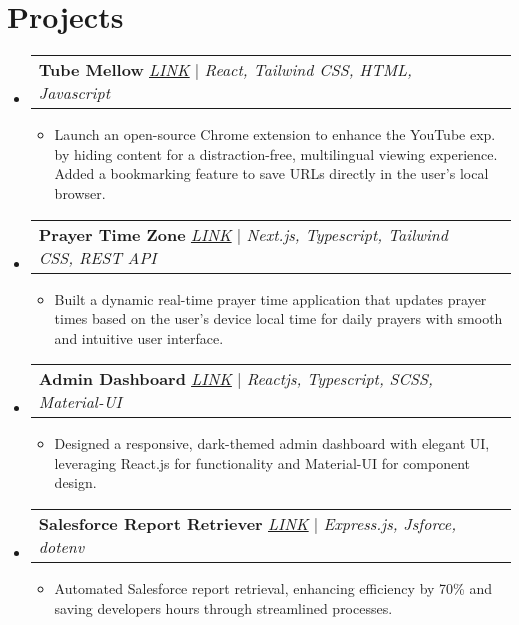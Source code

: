\documentclass[letterpaper,11pt]{article}
\makeatletter
\newcommand{\resumeItem}[1]{
  \item\small{
    {#1 \vspace{-2pt}}
  }
}
\newcommand{\resumeProjectHeading}[2]{
    \item
    \begin{tabular*}{0.97\textwidth}{l@{\extracolsep{\fill}}r}
      \small#1 & #2 \\
    \end{tabular*}\vspace{-7pt}
}
\newcommand{\resumeSubHeadingListStart}{\begin{itemize}[leftmargin=0.15in, label={}]}
\newcommand{\resumeSubHeadingListEnd}{\end{itemize}}
\newcommand{\resumeItemListStart}{\begin{itemize}}
\newcommand{\resumeItemListEnd}{\end{itemize}\vspace{-5pt}}
\makeatother
\begin{document}
\section{Projects}
    \resumeSubHeadingListStart
      \resumeProjectHeading
          {\textbf{Tube Mellow} \href{https://chromewebstore.google.com/detail/tube-mellow/fgflinjcolmfjdkilakkcgennlkhgkgh}{\underline{\emph{LINK}}} | \emph{React, Tailwind CSS, HTML, Javascript}}{}
          \resumeItemListStart
            \resumeItem{Launch an open-source Chrome extension to enhance the YouTube exp. by hiding content for a distraction-free,
multilingual viewing experience. Added a bookmarking feature to save URLs directly in the user’s local browser.}
          \resumeItemListEnd
      \resumeProjectHeading
          {\textbf{Prayer Time Zone} \href{https://prayer-time-zone.vercel.app/}{\underline{\emph{LINK}}} | \emph{Next.js, Typescript, Tailwind CSS, REST API}}{}
          \resumeItemListStart
            \resumeItem{Built a dynamic real-time prayer time application that updates prayer times based on the user’s device local time for daily prayers with smooth and intuitive user interface.}
          \resumeItemListEnd
      \resumeProjectHeading
          {\textbf{Admin Dashboard} \href{https://admin-dashboard-hakeem.vercel.app/}{\underline{\emph{LINK}}} | \emph{Reactjs, Typescript, SCSS, Material-UI}}{}
          \resumeItemListStart
            \resumeItem{Designed a responsive, dark-themed admin dashboard with elegant UI, leveraging React.js for functionality and Material-UI for component design.}
          \resumeItemListEnd
      \resumeProjectHeading
          {\textbf{Salesforce Report Retriever} \href{https://github.com/hakeemsalman/Salesforce-Report-Retriever/}{\underline{\emph{LINK}}} | \emph{Express.js, Jsforce, dotenv}}{}
          \resumeItemListStart
            \resumeItem{Automated Salesforce report retrieval, enhancing efficiency by 70\% and saving developers hours through streamlined processes.}
          \resumeItemListEnd
    \resumeSubHeadingListEnd


%
\end{document}
